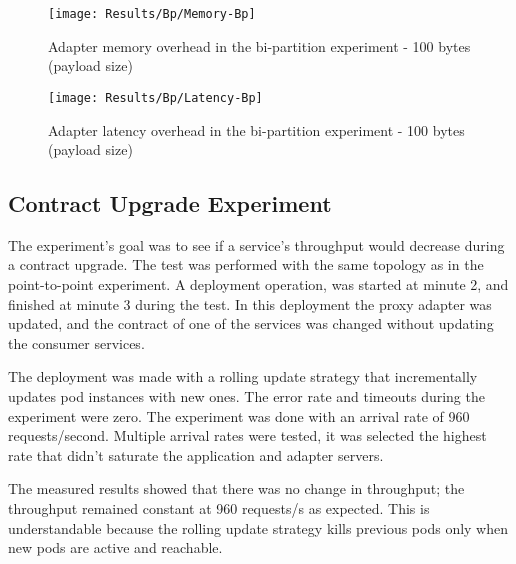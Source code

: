 \begin{figure}[htbp]
    \centering
    \centerline{\texttt{[image: Results/Bp/Memory-Bp]}}
    \caption{Adapter memory overhead in the bi-partition experiment - 100 bytes (payload size)}
    \label{fig:biPartMem}
\end{figure}

\begin{figure}[htbp]
    \centering
    \centerline{\texttt{[image: Results/Bp/Latency-Bp]}}
    \caption{Adapter latency overhead in the bi-partition experiment - 100 bytes (payload size)}
    \label{fig:biPartLatency}
\end{figure}

\subsection{Contract Upgrade Experiment}

The experiment's goal was to see if a service's throughput would decrease during a contract upgrade.
The test was performed with the same topology as in the point-to-point experiment.
A deployment operation, was started at minute 2, and finished at minute 3 during the test.
In this deployment the proxy adapter was updated, and the contract of one of the services was changed without updating the consumer services.

The deployment was made with a rolling update strategy that incrementally updates pod instances with new ones.
The error rate and timeouts during the experiment were zero.
The experiment was done with an arrival rate of 960 requests/second.
Multiple arrival rates were tested, it was selected the highest rate that didn't saturate the application and adapter servers.

The measured results showed that there was no change in throughput; the throughput remained constant at 960 requests/s as expected.
This is understandable because the rolling update strategy kills previous pods only when new pods are active and reachable.